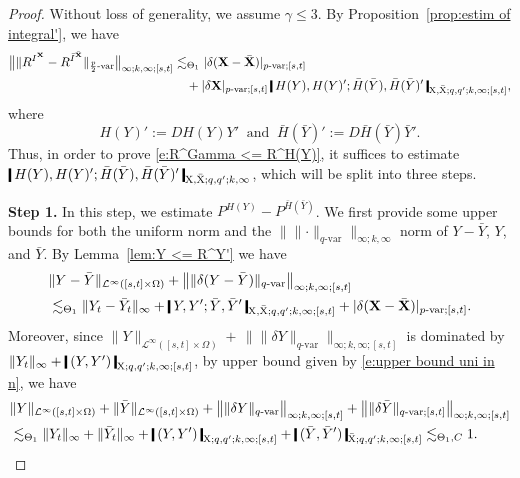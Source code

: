 \documentclass[11pt,reqno]{amsart}
\numberwithin{equation}{section}
\newcommand{\shortthickbar}{%
  \vcenter{\hbox{\rule{1.8pt}{2.2ex}}}%
}
\newcommand{\thicknm}[1]{%
  \mathopen{\shortthickbar}%
  \mkern4mu #1 \mkern4mu%
  \mathclose{\shortthickbar}%
}
\begin{document}
\begin{proof}
Without loss of generality, we assume $\gamma \le 3$. By Proposition~\ref{prop:estim of integral'}, we have 
\begin{equation}\label{e:R^Gamma <= R^H(Y)'}
\begin{aligned}
\big\| \|R^{I^{\mathbf X}} - R^{\bar I^{\bar{\mathbf X}}}\|_{\frac{p}{2}\text{-}\mathrm{var}} \big\|_{\infty;k,\infty;[s,t]}
&\lesssim_{\Theta_1} |\delta (\mathbf X - \bar{\mathbf X}) |_{p\text{-}\mathrm{var};[s,t]}\\
&\quad + |\delta \mathbf X|_{p\text{-}\mathrm{var};[s,t]}\, \thicknm{H(Y),H(Y)'; \bar H(\bar Y), \bar H (\bar Y)'}_{\mathrm X,\bar{\mathrm X};q,q';k,\infty;[s,t]}, 
\end{aligned}
\end{equation}
where
\begin{equation*}
H(Y)' := DH(Y) Y'\ \text{ and }\   \bar H(\bar Y)' := D \bar H(\bar Y)  \bar Y'.
\end{equation*}
Thus, in order to prove \eqref{e:R^Gamma <= R^H(Y)}, it suffices to estimate  $\thicknm{H(Y),H(Y)'; \bar H(\bar Y), \bar H(\bar Y)'}_{\mathrm X,\bar{\mathrm X};q,q';k,\infty}$, which will be split into three steps. 

{\bf Step 1.} In this step, we estimate $P^{H(Y)} - P^{ \bar H(\bar Y)}$. We first provide some upper bounds for both the uniform norm and the $\| \|\bm\cdot\|_{q\text{-}\mathrm{var}} \|_{\infty;k,\infty}$ norm of $Y - \bar Y$, $Y$, and $\bar Y$. By  Lemma~\ref{lem:Y <= R^Y'} we have 
\begin{equation}\label{e:Y <= R^Y}
\begin{aligned}
&\|Y - \bar Y\|_{\mathcal L^{\infty}([s,t] \times \Omega)} + \big\| \|\delta (Y - \bar Y)\|_{q\text{-}\mathrm{var}} \big\|_{\infty;k,\infty;[s,t]} \\
& \lesssim_{\Theta_{1}} \|Y_t - \bar Y_t\|_{\infty} + \thicknm{Y ,Y'; \bar Y, \bar Y'}_{\mathrm X,\bar{\mathrm X};q,q';k,\infty;[s,t]} + |\delta (\mathbf X - \bar{\mathbf X}) |_{p\text{-}\mathrm{var};[s,t]}. 
\end{aligned}
\end{equation}
Moreover, since $\|Y\|_{\mathcal L^{\infty}([s,t] \times \Omega)} + \, \| \|\delta Y\|_{q\text{-}\mathrm{var}} \|_{\infty;k,\infty;[s,t]}$ is dominated by $\|Y_t\|_{\infty} + \thicknm{(Y,Y')}_{\mathrm X;q,q';k,\infty;[s,t]}$, by upper bound given by \eqref{e:upper bound uni in n}, we have
\begin{equation}\label{e:Y^n 1/q <= (Y^n,Y^n')}
\begin{aligned}
&\|Y\|_{\mathcal L^{\infty}([s,t] \times \Omega)} + \|\bar Y\|_{\mathcal L^{\infty}([s,t] \times \Omega)} +  \big\| \|\delta Y\|_{q\text{-}\mathrm{var}} \big\|_{\infty;k,\infty;[s,t]} +  \big\| \|\delta \bar Y\|_{q\text{-}\mathrm{var};[s,t]} \big\|_{\infty;k,\infty;[s,t]} \\
&\lesssim_{\Theta_{1}} \|Y_t\|_{\infty} + \|\bar Y_t\|_{\infty} +  \thicknm{(Y,Y')}_{\mathrm X;q,q';k,\infty;[s,t]} + \thicknm{(\bar Y,\bar Y')}_{\bar{\mathrm X};q,q';k,\infty;[s,t]}\lesssim_{\Theta_{1},C} 1.
\end{aligned}
\end{equation}


\end{proof}
\end{document}
